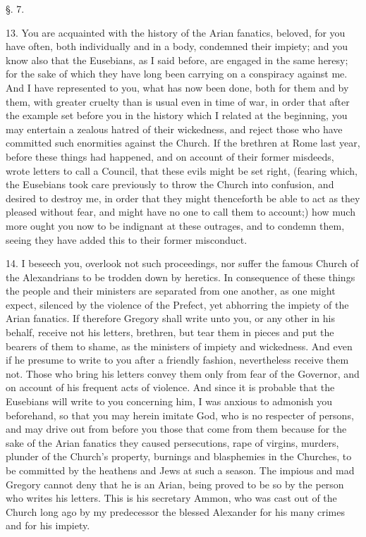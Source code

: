 §. 7.

13. You are acquainted with the history of the
Arian fanatics, beloved, for you have often, both individually and in
a body, condemned their impiety; and you know also that the Eusebians,
as I said before, are engaged in the same heresy; for the sake of
which they have long been carrying on a conspiracy against me. And I
have represented to you, what has now been done, both for them and by
them, with greater cruelty than is usual even in time of war, in order
that after the example set before you in the history which I related at the beginning, you may entertain a zealous hatred of their
wickedness, and reject those who have committed such enormities
against the Church. If the brethren at Rome last year, before these
things had happened, and on account of their former misdeeds, wrote
letters to call a Council, that these evils might be set right,
(fearing which, the Eusebians took care previously to throw the Church
into confusion, and desired to destroy me, in order that they might
thenceforth be able to act as they pleased without fear, and might
have no one to call them to account;) how much more ought you now to
be indignant at these outrages, and to condemn them, seeing they have
added this to their former misconduct.

14. I beseech you, overlook not such proceedings,
nor suffer the famous Church of the Alexandrians to be trodden down by
heretics. In consequence of these things the people and their
ministers are separated from one another, as one might expect,
silenced by the violence of the Prefect, yet abhorring the impiety of
the Arian fanatics. If therefore Gregory shall write unto you, or any
other in his behalf, receive not his letters, brethren, but tear them
in pieces and put the bearers of them to shame, as the ministers of
impiety and wickedness. And even if he presume to write to you after a
friendly fashion, nevertheless receive them not. Those who bring his
letters convey them only from fear of the Governor, and on account of
his frequent acts of violence. And since it is probable that the
Eusebians will write to you concerning him, I was anxious to admonish
you beforehand, so that you may herein imitate God, who is no
respecter of persons, and may drive out from before you those that
come from them because for the sake of the Arian fanatics they caused
persecutions, rape of virgins, murders, plunder of the Church's
property, burnings and blasphemies in the Churches, to be committed by
the heathens and Jews at such a season. The impious and mad Gregory
cannot deny that he is an Arian, being proved to be so by the person
who writes his letters. This is his secretary Ammon, who was cast out
of the Church long ago by my predecessor the blessed Alexander for his
many crimes and for his impiety.

